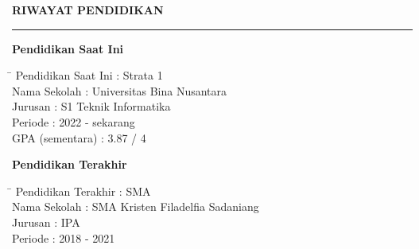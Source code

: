 \documentclass[12pt,a4paper]{article}
\begin{document}
\vspace{0.8cm}
\textbf{RIWAYAT PENDIDIKAN}
\vspace{0.2cm}
\hrule
\vspace{0.5cm}

\textbf{Pendidikan Saat Ini}
\begin{tabbing}
\hspace{4cm} \= \hspace{10cm} \kill
Pendidikan Saat Ini \> : Strata 1 \\
Nama Sekolah \> : Universitas Bina Nusantara \\
Jurusan \> : S1 Teknik Informatika \\
Periode \> : 2022 - sekarang \\
GPA (sementara) \> : 3.87 / 4 \\
\end{tabbing}

\vspace{0.3cm}

\textbf{Pendidikan Terakhir}
\begin{tabbing}
\hspace{4cm} \= \hspace{10cm} \kill
Pendidikan Terakhir \> : SMA \\
Nama Sekolah \> : SMA Kristen Filadelfia Sadaniang  \\
Jurusan \> : IPA \\
Periode \> : 2018 - 2021 \\
\end{tabbing}





\end{document}
